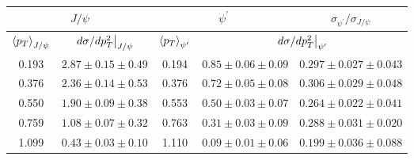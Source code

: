 \begin{tabular}{cc|ccc}
\hline
\multicolumn{2}{c|}{$J/\psi$}                     & \multicolumn{2}{c|}{$\psi^{\prime}$}                                   & $\sigma_{\psi^\prime}/\sigma_{J/\psi}$ \\ \hline
$\expval{p_T}_{J/\psi}$ & $\eval{d\sigma/dp_T^2}_{J/\psi}$ & $\expval{p_T}_{\psi^\prime}$ & \multicolumn{2}{c}{$\eval{d\sigma/dp_T^2}_{\psi^\prime}$} \\ \hline
\multicolumn{1}{c|}{0.193} & $2.87\pm0.15\pm0.49$ & \multicolumn{1}{c|}{0.194} & \multicolumn{1}{c|}{$0.85\pm0.06\pm0.09$} & $0.297\pm0.027\pm0.043$                \\
\multicolumn{1}{c|}{0.376} & $2.36\pm0.14\pm0.53$ & \multicolumn{1}{c|}{0.376} & \multicolumn{1}{c|}{$0.72\pm0.05\pm0.08$} & $0.306\pm0.029\pm0.048$                \\
\multicolumn{1}{c|}{0.550} & $1.90\pm0.09\pm0.38$ & \multicolumn{1}{c|}{0.553} & \multicolumn{1}{c|}{$0.50\pm0.03\pm0.07$} & $0.264\pm0.022\pm0.041$                \\
\multicolumn{1}{c|}{0.759} & $1.08\pm0.07\pm0.32$ & \multicolumn{1}{c|}{0.763} & \multicolumn{1}{c|}{$0.31\pm0.03\pm0.09$} & $0.288\pm0.031\pm0.020$                \\
\multicolumn{1}{c|}{1.099} & $0.43\pm0.03\pm0.10$ & \multicolumn{1}{c|}{1.110} & \multicolumn{1}{c|}{$0.09\pm0.01\pm0.06$} & $0.199\pm0.036\pm0.088$                \\ \hline
\end{tabular}
